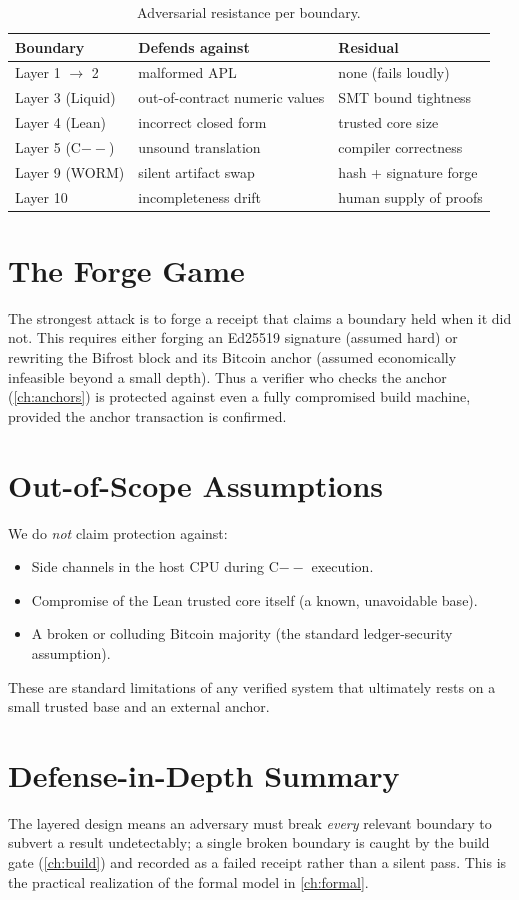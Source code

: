 \begin{table}[ht]
\centering
\caption{Adversarial resistance per boundary.}\label{tab:threat}
\small
\begin{tabular}{p{2.6cm} p{5.0cm} p{4.0cm}}
\toprule
\textbf{Boundary} & \textbf{Defends against} & \textbf{Residual} \\
\midrule
Layer 1 $\to$ 2 & malformed APL & none (fails loudly) \\
Layer 3 (Liquid) & out-of-contract numeric values & SMT bound tightness \\
Layer 4 (Lean) & incorrect closed form & trusted core size \\
Layer 5 (C$--$) & unsound translation & compiler correctness \\
Layer 9 (WORM) & silent artifact swap & hash + signature forge \\
Layer 10 & incompleteness drift & human supply of proofs \\
\bottomrule
\end{tabular}
\end{table}

\section{The Forge Game}
\label{sec:threat-forge}

The strongest attack is to forge a receipt that claims a boundary held when
it did not. This requires either forging an Ed25519 signature (assumed
hard) or rewriting the Bifrost block and its Bitcoin anchor (assumed
economically infeasible beyond a small depth). Thus a verifier who checks
the anchor (\cref{ch:anchors}) is protected against even a fully
compromised build machine, provided the anchor transaction is confirmed.

\section{Out-of-Scope Assumptions}
\label{sec:threat-out}

We do \emph{not} claim protection against:
\begin{itemize}
  \item Side channels in the host CPU during C$--$ execution.
  \item Compromise of the Lean trusted core itself (a known,
        unavoidable base).
  \item A broken or colluding Bitcoin majority (the standard
        ledger-security assumption).
\end{itemize}
These are standard limitations of any verified system that ultimately
rests on a small trusted base and an external anchor.

\section{Defense-in-Depth Summary}
\label{sec:threat-summary}

The layered design means an adversary must break \emph{every} relevant
boundary to subvert a result undetectably; a single broken boundary is
caught by the build gate (\cref{ch:build}) and recorded as a failed
receipt rather than a silent pass. This is the practical realization of
the formal model in \cref{ch:formal}.
